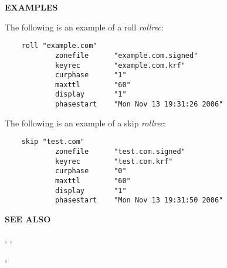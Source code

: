 \clearpage
{\bf EXAMPLES}

The following is an example of a roll {\it rollrec}:

\begin{verbatim}
    roll "example.com"
            zonefile      "example.com.signed"
            keyrec        "example.com.krf"
            curphase      "1"
            maxttl        "60"
            display       "1"
            phasestart    "Mon Nov 13 19:31:26 2006"
\end{verbatim}

The following is an example of a skip {\it rollrec}:

\begin{verbatim}
    skip "test.com"
            zonefile      "test.com.signed"
            keyrec        "test.com.krf"
            curphase      "0"
            maxttl        "60"
            display       "1"
            phasestart    "Mon Nov 13 19:31:50 2006"
\end{verbatim}

{\bf SEE ALSO}


,
,

,

